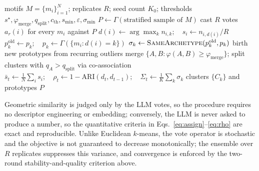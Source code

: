 \begin{algorithm}[t]
\caption{Agentic consensus $k$-means for motif clustering}
\label{alg:cluster}
\begin{algorithmic}[1]
\Require motifs $M=\{m_i\}_{i=1}^N$; replicates $R$; seed count $K_0$;
         thresholds $s^\star,\varphi_{\mathrm{merge}},q_{\mathrm{split}},
         c_{\mathrm{th}},s_{\min},\varepsilon,\sigma_{\min}$
\State $P \gets \Gamma(\text{stratified sample of } M)$
\Repeat
  \State cast $R$ votes $a_r(i)$ for every $m_i$ against $P$
  \State $d(i)\gets\arg\max_k n_{i,k};\quad s_i\gets n_{i,d(i)}/R$
     \State $p_k^{\mathrm{old}}\gets p_k;\quad p_k \gets \Gamma(\{m_i:d(i)=k\})$
     \State $\sigma_k\gets \textsc{SameArchetype}(p_k^{\mathrm{old}},p_k)$
  \EndFor
  \State birth new prototypes from recurring outliers
  \State merge $\{A,B:\varphi(A,B)\!\ge\!\varphi_{\mathrm{merge}}\}$;
         split clusters with $q_A\!>\!q_{\mathrm{split}}$ via
         co-association 
  \State $\bar s_t\gets\tfrac1N\sum_i s_i;\quad
         \rho_t\gets 1-\mathrm{ARI}(d_t,d_{t-1});\quad
         \Sigma_t\gets\tfrac1K\sum_k\sigma_k$ 
\State \Return clusters $\{C_k\}$ and prototypes $P$
\end{algorithmic}
\end{algorithm}

Geometric similarity is judged only by the LLM votes, so the procedure requires
no descriptor engineering or embedding; conversely, the LLM is never asked to
produce a number, so the quantitative criteria in
Eqs.~\eqref{eq:assign}--\eqref{eq:rho} are exact and reproducible. Unlike
Euclidean $k$-means, the vote operator is stochastic and the objective is not
guaranteed to decrease monotonically; the ensemble over $R$ replicates suppresses
this variance, and convergence is enforced by the two-round stability-and-quality
criterion above.
